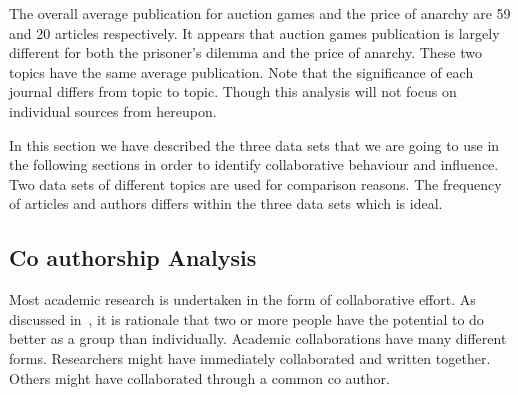 \documentclass{article}
\theoremstyle{definition}
\begin{document}
The overall average publication for auction games and the price of anarchy are 59 and 20 articles
respectively. It appears that auction games publication is largely different
for both the prisoner's dilemma and the price of anarchy. These two topics have
the same average publication. Note that the significance of each journal differs
from topic to topic. Though this analysis will not focus on individual sources
from hereupon.



%     

In this section we have described the three data sets that we are going to use
in the following sections in order to identify collaborative behaviour and influence.
Two data sets of different topics are used for comparison reasons. The frequency of
articles and authors differs within the three data sets which is ideal.


\subsection{Co authorship Analysis}\label{section:co_authorship_analysis}

Most academic research is undertaken in the form of
collaborative effort. As discussed in~\cite{Kyvik2017}, it is rationale that two
or more people have the potential to do better as a group than individually. Academic collaborations
have many different forms. Researchers might have immediately collaborated and
written together. Others might have collaborated through a common co author.
\end{document}
